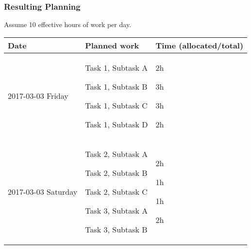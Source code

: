 \subsubsection{Resulting Planning}\label{resulting-planning}
Assume 10 effective hours of work per day.

\begin{longtable}[c]{@{}lll@{}}
\toprule
\begin{minipage}[b]{0.28\columnwidth}\raggedright\strut
Date
\strut\end{minipage} &
\begin{minipage}[b]{0.25\columnwidth}\raggedright\strut
Planned work
\strut\end{minipage} &
\begin{minipage}[b]{0.32\columnwidth}\raggedright\strut
Time (allocated/total)
\strut\end{minipage}\tabularnewline
\midrule
\endhead
\begin{minipage}[t]{0.28\columnwidth}\raggedright\strut
2017-03-03 Friday
\strut\end{minipage} &
\begin{minipage}[t]{0.25\columnwidth}\raggedright\strut
Task 1, Subtask A

Task 1, Subtask B

Task 1, Subtask C

Task 1, Subtask D
\strut\end{minipage} &
\begin{minipage}[t]{0.32\columnwidth}\raggedright\strut
2h

3h

3h

2h
\strut\end{minipage}\tabularnewline
\begin{minipage}[t]{0.28\columnwidth}\raggedright\strut
2017-03-03 Saturday
\strut\end{minipage} &
\begin{minipage}[t]{0.25\columnwidth}\raggedright\strut
Task 2, Subtask A

Task 2, Subtask B

Task 2, Subtask C

Task 3, Subtask A

Task 3, Subtask B
\strut\end{minipage} &
\begin{minipage}[t]{0.32\columnwidth}\raggedright\strut
2h

1h

1h

2h


\end{minipage}
\end{longtable}
